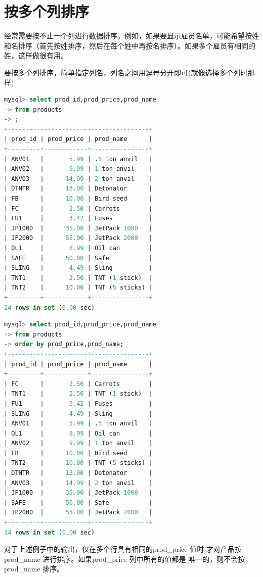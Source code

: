 \documentclass[11pt,a4paper,oneside]{book}
\begin{document}
\section{按多个列排序}
经常需要按不止一个列进行数据排序。例如，如果要显示雇员名单，可能希望按姓和名排序（首先按姓排序，然后在每个姓中再按名排序）。如果多个雇员有相同的姓，这样做很有用。

要按多个列排序，简单指定列名，列名之间用逗号分开即可(就像选择多个列时那样).
\begin{lstlisting}[language=sql]
mysql> select prod_id,prod_price,prod_name
-> from products
-> ;
+---------+------------+----------------+
| prod_id | prod_price | prod_name      |
+---------+------------+----------------+
| ANV01   |       5.99 | .5 ton anvil   |
| ANV02   |       9.99 | 1 ton anvil    |
| ANV03   |      14.99 | 2 ton anvil    |
| DTNTR   |      13.00 | Detonator      |
| FB      |      10.00 | Bird seed      |
| FC      |       2.50 | Carrots        |
| FU1     |       3.42 | Fuses          |
| JP1000  |      35.00 | JetPack 1000   |
| JP2000  |      55.00 | JetPack 2000   |
| OL1     |       8.99 | Oil can        |
| SAFE    |      50.00 | Safe           |
| SLING   |       4.49 | Sling          |
| TNT1    |       2.50 | TNT (1 stick)  |
| TNT2    |      10.00 | TNT (5 sticks) |
+---------+------------+----------------+
14 rows in set (0.00 sec)
\end{lstlisting}
\begin{lstlisting}[language=sql]
mysql> select prod_id,prod_price,prod_name
-> from products
-> order by prod_price,prod_name;
+---------+------------+----------------+
| prod_id | prod_price | prod_name      |
+---------+------------+----------------+
| FC      |       2.50 | Carrots        |
| TNT1    |       2.50 | TNT (1 stick)  |
| FU1     |       3.42 | Fuses          |
| SLING   |       4.49 | Sling          |
| ANV01   |       5.99 | .5 ton anvil   |
| OL1     |       8.99 | Oil can        |
| ANV02   |       9.99 | 1 ton anvil    |
| FB      |      10.00 | Bird seed      |
| TNT2    |      10.00 | TNT (5 sticks) |
| DTNTR   |      13.00 | Detonator      |
| ANV03   |      14.99 | 2 ton anvil    |
| JP1000  |      35.00 | JetPack 1000   |
| SAFE    |      50.00 | Safe           |
| JP2000  |      55.00 | JetPack 2000   |
+---------+------------+----------------+
14 rows in set (0.00 sec)
\end{lstlisting}
对于上述例子中的输出，仅在多个行具有相同的prod\_price 值时
才对产品按prod\_name 进行排序。如果prod\_price 列中所有的值都是
唯一的，则不会按prod\_name 排序。
\end{document}
